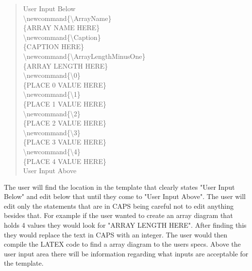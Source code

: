 \documentclass[10pt,a4paper,english]{article}
\begin{document}
\begin{flushleft}
\begin{quote}{\ttfamily \raggedright \noindent
User Input Below~\\
{\textbackslash}newcommand{\{}{\textbackslash}ArrayName{\}}~\\
{\{}ARRAY NAME HERE{\}}~\\
{\textbackslash}newcommand{\{}{\textbackslash}Caption{\}}~\\
{\{}CAPTION HERE{\}}~\\
{\textbackslash}newcommand{\{}{\textbackslash}ArrayLengthMinusOne{\}}~\\
{\{}ARRAY LENGTH HERE{\}}~\\
{\textbackslash}newcommand{\{}{\textbackslash}0{\}}~\\
{\{}PLACE 0 VALUE HERE{\}}~\\
{\textbackslash}newcommand{\{}{\textbackslash}1{\}}~\\
{\{}PLACE 1 VALUE HERE{\}}~\\
{\textbackslash}newcommand{\{}{\textbackslash}2{\}}~\\
{\{}PLACE 2 VALUE HERE{\}}~\\
{\textbackslash}newcommand{\{}{\textbackslash}3{\}}~\\
{\{}PLACE 3 VALUE HERE{\}}~\\
{\textbackslash}newcommand{\{}{\textbackslash}4{\}}~\\
{\{}PLACE 4 VALUE HERE{\}}~\\
User Input Above~\\
}\end{quote}

The user will find the location in the template that clearly states "User Input Below" and edit below that until they come to "User Input Above".  The user will edit only the statements that are in CAPS being careful not to edit anything besides that.  For example if the user wanted to create an array diagram that holds 4 values they would look for "ARRAY LENGTH HERE".  After finding this they would replace the text in CAPS with an integer.  The user would then compile the LATEX code to find a array diagram to the users specs.  Above the user input area there will be information regarding what inputs are acceptable for the template. 


\end{flushleft}
\end{document}
